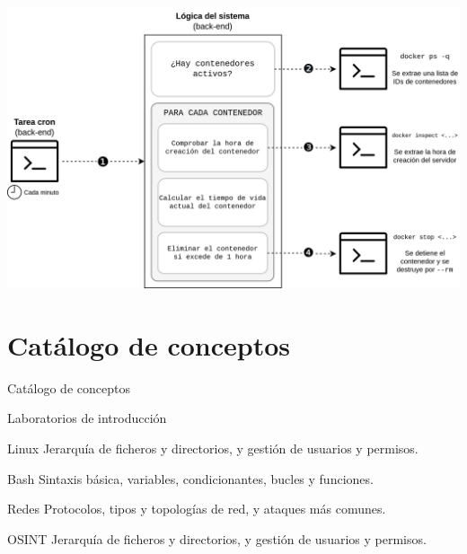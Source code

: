     \begin{frame}
        \centering

        \includegraphics[scale=0.15]{images/diagramas/cron.png}
    \end{frame}


\section{Catálogo de conceptos}

    \begin{frame}
        \Huge{\centerline{Catálogo de conceptos}}
    \end{frame}

    \begin{frame}{Laboratorios de introducción}
        \begin{block}{Linux}
            Jerarquía de ficheros y directorios, y gestión de usuarios y permisos.
        \end{block}
        \begin{block}{Bash}
            Sintaxis básica, variables, condicionantes, bucles y funciones.
        \end{block}

        \begin{block}{Redes}
            Protocolos, tipos y topologías de red, y ataques más comunes.
        \end{block}

        \begin{block}{OSINT}
            Jerarquía de ficheros y directorios, y gestión de usuarios y permisos.
        \end{block}
    \end{frame}
    
